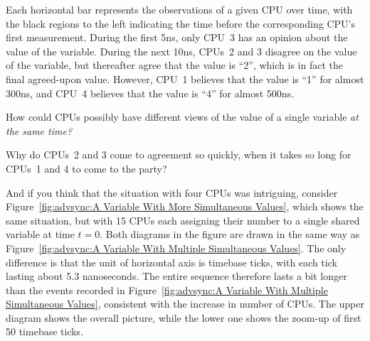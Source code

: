 Each horizontal bar represents the observations of a given CPU over time,
with the black regions to the left indicating the time before the
corresponding CPU's first measurement.
During the first 5ns, only CPU~3 has an opinion about the value of the
variable.
During the next 10ns, CPUs~2 and 3 disagree on the value of the variable,
but thereafter agree that the value is ``2'', which is in fact
the final agreed-upon value.
However, CPU~1 believes that the value is ``1'' for almost 300ns, and
CPU~4 believes that the value is ``4'' for almost 500ns.

\QuickQuiz{}
	How could CPUs possibly have different views of the
	value of a single variable \emph{at the same time?}
 \QuickQuizEnd

\QuickQuiz{}
	Why do CPUs~2 and 3 come to agreement so quickly, when it
	takes so long for CPUs~1 and 4 to come to the party?
 \QuickQuizEnd

And if you think that the situation with four CPUs was intriguing, consider
Figure~\ref{fig:advsync:A Variable With More Simultaneous Values},
which shows the same situation, but with 15 CPUs each assigning their
number to a single shared variable at time $t=0$. Both diagrams in the
figure are drawn in the same way as 
Figure~\ref{fig:advsync:A Variable With Multiple Simultaneous Values}.
The only difference is that the unit of horizontal axis is timebase ticks,
with each tick lasting about 5.3 nanoseconds.
The entire sequence therefore lasts a bit longer than the events recorded in
Figure~\ref{fig:advsync:A Variable With Multiple Simultaneous Values},
consistent with the increase in number of CPUs.
The upper diagram shows the overall picture, while the lower one shows
the zoom-up of first 50 timebase ticks.

